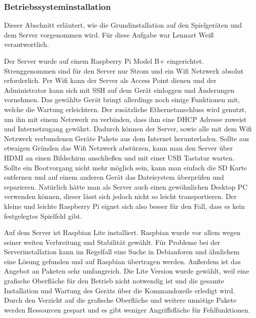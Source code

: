 \subsubsection{Betriebssysteminstallation}

Dieser Abschnitt erläutert, wie die Grundinstallation auf den Spielgeräten und dem Server
vorgenommen wird.
Für diese Aufgabe war Lennart Weiß verantwortlich.

Der Server wurde auf einem Raspberry Pi Model B+ eingerichtet. Strenggenommen
sind für den Server nur Strom und ein Wifi Netzwerk absolut erforderlich. Per
Wifi kann der Server als Access Point dienen und der Administrator kann sich mit
SSH auf dem Gerät einloggen und Änderungen vornehmen. Das gewählte Gerät bringt
allerdings noch einige Funktionen mit, welche die Wartung erleichtern. Der
zusätzliche Ethernetanschluss wird genutzt, um ihn mit einem Netzwerk zu
verbinden, dass ihm eine DHCP Adresse zuweist und Internetzugang gewährt. 
Dadurch können der Server, sowie alle mit dem Wifi Netzwerk verbundenen Geräte
Pakete aus dem Internet herunterladen. Sollte aus etwaigen Gründen das Wifi
Netzwerk abstürzen, kann man den Server über HDMI an einen Bildschirm
anschließen und mit einer USB Tastatur warten. Sollte ein Bootvorgang nicht
mehr möglich sein, kann man einfach die SD Karte entfernen und auf einem anderen
Gerät das Dateisystem überprüfen und reparieren. Natürlich hätte man als Server
auch einen gewöhnlichen Desktop PC verwenden können, dieser lässt sich jedoch
nicht so leicht transportieren. Der kleine und leichte Raspberry Pi eignet sich
also besser für den Fall, dass es kein festgelegtes Spielfeld gibt.

Auf dem Server ist Raspbian Lite installiert. Raspbian wurde vor allem wegen 
seiner weiten Verbreitung und Stabilität gewählt. Für Probleme bei der 
Serverinstallation kann im Regelfall eine Suche in Debianforen und ähnlichem
eine Lösung gefunden und auf Raspbian übertragen werden. Außerdem ist das
Angebot an Paketen sehr umfangreich. Die Lite Version wurde gewählt, weil eine
grafische Oberfläche für den Betrieb nicht notwendig ist und die gesamte
Installation und Wartung des Geräts über die Kommandozeile erledigt wird.
Durch den Verzicht auf die grafische Oberfläche und weitere unnötige Pakete
werden Ressourcen gespart und es gibt weniger Angriffsfläche für Fehlfunktionen.

